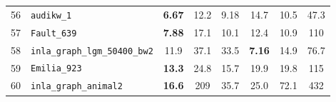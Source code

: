 \begin{footnotesize}
\begin{longtable}{rl cccccc}
56 & \texttt{audikw\_1} & \textbf{6.67} & 12.2 & 9.18 & 14.7 & 10.5 & 47.3 \\
57 & \texttt{Fault\_639} & \textbf{7.88} & 17.1 & 10.1 & 12.4 & 10.9 & 110 \\
58 & \texttt{inla\_graph\_lgm\_50400\_bw2} & 11.9 & 37.1 & 33.5 & \textbf{7.16} & 14.9 & 76.7 \\
59 & \texttt{Emilia\_923} & \textbf{13.3} & 24.8 & 15.7 & 19.9 & 19.8 & 115 \\
60 & \texttt{inla\_graph\_animal2} & \textbf{16.6} & 209 & 35.7 & 25.0 & 72.1 & 432 \\
\end{longtable}
\end{footnotesize}
